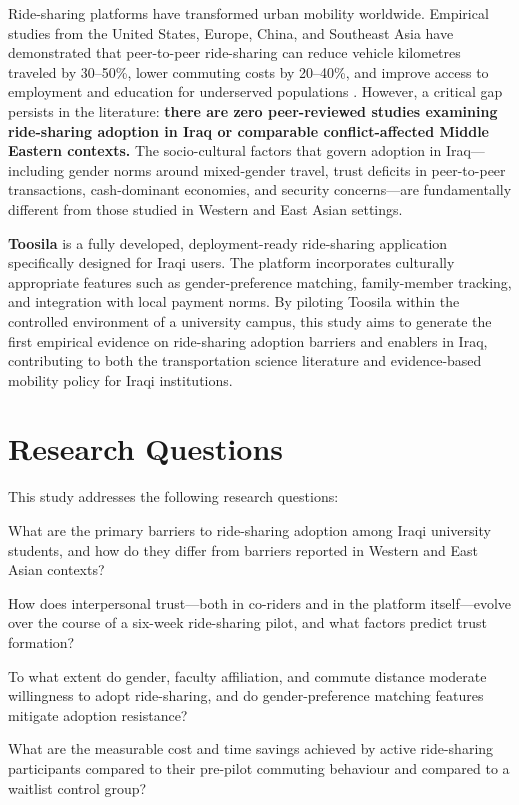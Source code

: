 \documentclass[12pt,a4paper]{article}
\begin{document}
Ride-sharing platforms have transformed urban mobility worldwide. Empirical studies from the United States, Europe, China, and Southeast Asia have demonstrated that peer-to-peer ride-sharing can reduce vehicle kilometres traveled by 30--50\%, lower commuting costs by 20--40\%, and improve access to employment and education for underserved populations \citep{Shaheen2016,Tirachini2020,Mouratidis2021}. However, a critical gap persists in the literature: \textbf{there are zero peer-reviewed studies examining ride-sharing adoption in Iraq or comparable conflict-affected Middle Eastern contexts.} The socio-cultural factors that govern adoption in Iraq---including gender norms around mixed-gender travel, trust deficits in peer-to-peer transactions, cash-dominant economies, and security concerns---are fundamentally different from those studied in Western and East Asian settings.

\textbf{Toosila} is a fully developed, deployment-ready ride-sharing application specifically designed for Iraqi users. The platform incorporates culturally appropriate features such as gender-preference matching, family-member tracking, and integration with local payment norms. By piloting Toosila within the controlled environment of a university campus, this study aims to generate the first empirical evidence on ride-sharing adoption barriers and enablers in Iraq, contributing to both the transportation science literature and evidence-based mobility policy for Iraqi institutions.

\section{Research Questions}
\label{sec:rq}

This study addresses the following research questions:

\begin{description}[style=nextline, font=\bfseries]
  \item[RQ1] What are the primary barriers to ride-sharing adoption among Iraqi university students, and how do they differ from barriers reported in Western and East Asian contexts?
  \item[RQ2] How does interpersonal trust---both in co-riders and in the platform itself---evolve over the course of a six-week ride-sharing pilot, and what factors predict trust formation?
  \item[RQ3] To what extent do gender, faculty affiliation, and commute distance moderate willingness to adopt ride-sharing, and do gender-preference matching features mitigate adoption resistance?
  \item[RQ4] What are the measurable cost and time savings achieved by active ride-sharing participants compared to their pre-pilot commuting behaviour and compared to a waitlist control group?
\end{description}
\end{document}
